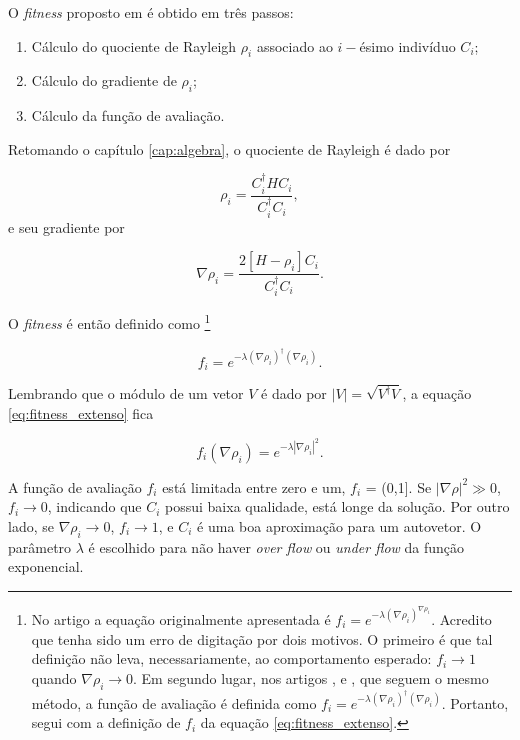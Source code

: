 	O \emph{fitness} proposto em \cite{metodo2004} é obtido em três passos:
	
	\begin{enumerate}
		\item \label{item:passo1} Cálculo do quociente de Rayleigh $\rho_i$ associado ao $i-$ésimo indivíduo $C_i$;
		\item \label{item:passo2} Cálculo do gradiente de $\rho_i$;
		\item \label{item:passo3} Cálculo da função de avaliação.
	\end{enumerate}
	
	Retomando o capítulo \ref{cap:algebra}, o quociente de Rayleigh é dado por
	
	\begin{equation}
		\rho_i = \frac{C_i^\dagger H C_i}{C_i^\dagger C_i},
	\end{equation}
	e seu gradiente por
	
	\begin{equation}\label{eq:grad_rho_metodo}
		\nabla \rho_i = \frac{2[H - \rho_i]C_i}{C_i^\dagger C_i}.
	\end{equation}
		
	O \emph{fitness} é então definido como \footnote{
		No artigo \cite{metodo2004} a equação originalmente apresentada é $f_i = e^{-\lambda (\nabla \rho_i)^{\nabla \rho_i}}$. Acredito que tenha sido um erro de digitação por dois motivos. O primeiro é que tal definição não leva, necessariamente, ao comportamento esperado: $f_i \rightarrow 1$ quando $\nabla \rho_i \rightarrow 0$. Em segundo lugar, nos artigos \cite{metodo2006},  \cite{metodo2008} e \cite{metodo2009}, que seguem o mesmo método, a função de avaliação é definida como $f_i = e^{-\lambda (\nabla \rho_i)^{\dagger} (\nabla \rho_i)}$. Portanto, segui com a definição de $f_i$ da equação \ref{eq:fitness_extenso}.}
	
	\begin{equation}\label{eq:fitness_extenso}
		f_i = e^{-\lambda (\nabla \rho_i)^\dagger (\nabla \rho_i)}.
	\end{equation}
	
	Lembrando que o módulo de um vetor $V$ é dado por $|V| = \sqrt{V^{\dagger} V}$, a equação \ref{eq:fitness_extenso} fica
	
	\begin{equation}\label{eq:fitness_grad}
		f_i(\nabla \rho_i) = e^{-\lambda |\nabla \rho_i|^2}.
	\end{equation}
			 
	A função de avaliação $f_i$ está limitada entre zero e um, $f_i$ = (0,1]. Se $|\nabla \rho|^2 \gg 0$, $f_i \rightarrow 0$, indicando que $C_i$ possui baixa qualidade, está longe da solução. Por outro lado, se $\nabla \rho_i \rightarrow 0 $, $f_i \rightarrow 1$, e $C_i$ é uma boa aproximação para um autovetor. O parâmetro $\lambda$ é escolhido para não haver \emph{over flow} ou \emph{under flow} da função exponencial.
	
